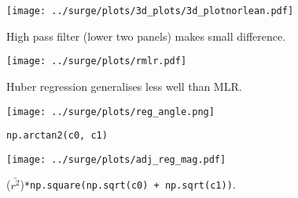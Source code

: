 \begin{figure}
\centering
\texttt{[image: ../surge/plots/3d\_plots/3d\_plotnorlean.pdf]}
 \caption{High pass filter (lower two panels) makes small difference.}
 \label{fig:tau-tau-resp}
\end{figure}


\begin{figure*}
\centering
 \hspace{-40pt} \texttt{[image: ../surge/plots/rmlr.pdf]}
  \vspace{-15pt}
 \caption{Huber regression generalises less well than MLR.}
 \label{fig:tau-tau-resp}
 \hspace{-40pt} \texttt{[image: ../surge/plots/reg\_angle.png]}
  \vspace{-15pt}
 \caption{\texttt{np.arctan2(c0, c1)}}
  \label{fig:tau-tau-angle}
  \hspace{-40pt} \texttt{[image: ../surge/plots/adj\_reg\_mag.pdf]}
   \vspace{-15pt}
  \caption{($\bar{r^2}$)\texttt{*np.square(np.sqrt(c0) + np.sqrt(c1))}. }
   \label{fig:tau-tau-responsiveness}
\end{figure*}
